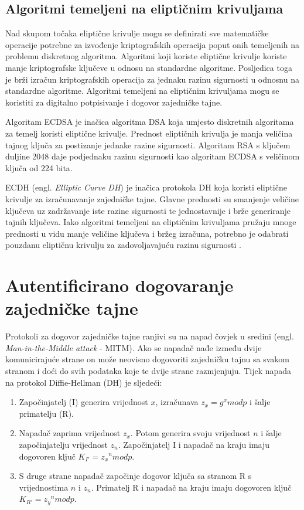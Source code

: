 \subsection{Algoritmi temeljeni na eliptičnim krivuljama}

Nad skupom točaka eliptične krivulje mogu se definirati sve matematičke
operacije potrebne za izvođenje kriptografskih operacija poput onih temeljenih
na problemu diskretnog algoritma.
Algoritmi koji koriste eliptične krivulje
koriste manje kriptografske ključeve u odnosu na standardne algoritme.
Posljedica toga je brži izračun kriptografskih operacija za jednaku
razinu sigurnosti u odnosnu na standardne algoritme.
Algoritmi temeljeni na eliptičnim krivuljama mogu se koristiti za digitalno
potpisivanje i dogovor zajedničke tajne.
\cite[str. 397]{van2011encyclopedia}


Algoritam ECDSA \cite[str. 407]{van2011encyclopedia} je inačica algoritma DSA
koja umjesto diskretnih algoritama za
temelj koristi eliptične krivulje. Prednost eliptičnih krivulja je
manja veličina tajnog ključa za postizanje jednake razine sigurnosti. Algoritam
RSA s
ključem duljine 2048 daje podjednaku razinu sigurnosti kao algoritam ECDSA s
veličinom ključa
od 224 bita.

ECDH \cite[str. 400]{van2011encyclopedia} (engl. \emph{Elliptic Curve DH}) je
inačica protokola DH koja koristi
eliptične krivulje za izračunavanje zajedničke tajne. Glavne prednosti su
smanjenje veličine ključeva uz zadržavanje iste razine sigurnosti te
jednostavnije i brže generiranje tajnih ključeva.
Iako algoritmi temeljeni na eliptičnim krivuljama pružaju mnoge prednosti u vidu
manje veličine ključeva i bržeg izračuna, potrebno je odabrati pouzdanu
eliptičnu krivulju za zadovoljavajuću razinu sigurnosti \cite{safecurves}.

\section{Autentificirano dogovaranje zajedničke tajne}

Protokoli za dogovor zajedničke tajne ranjivi su na napad čovjek u sredini
(engl. \emph{Man-in-the-Middle attack} - MITM). Ako se napadač nađe između dvije
komunicirajuće strane on može neovisno dogovoriti zajedničku tajnu sa svakom
stranom i doći do svih podataka koje te dvije strane razmjenjuju. Tijek napada
na protokol Diffie-Hellman (DH) je sljedeći:
\begin{enumerate}
\item Započinjatelj (I) generira vrijednost $x$, izračunava $z_x=g^x mod p$ i
šalje primatelju (R).
\item Napadač zaprima vrijednost $z_x$. Potom generira svoju vrijednost $n$ i
šalje započinjatelju vrijednost $z_n$. Započinjatelj I i napadač na kraju imaju
dogovoren ključ
$K_{I'}={z_x}^n mod p$.
\item S druge strane napadač započinje dogovor ključa sa stranom R s
vrijednostima $n$ i $z_n$. Primatelj R i napadač na kraju imaju dogovoren ključ
$K_{R'}={z_y}^n mod p$.
\end{enumerate}

